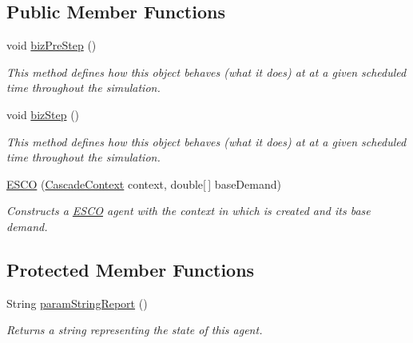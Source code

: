 \subsection*{Public Member Functions}
\begin{DoxyCompactItemize}
\item 
void \hyperlink{classuk_1_1ac_1_1dmu_1_1iesd_1_1cascade_1_1agents_1_1aggregators_1_1_e_s_c_o_a1bfb5cf021c3f6a5d0b517b97d358291}{biz\-Pre\-Step} ()
\begin{DoxyCompactList}\small\item\em This method defines how this object behaves (what it does) at at a given scheduled time throughout the simulation. \end{DoxyCompactList}\item 
\hypertarget{classuk_1_1ac_1_1dmu_1_1iesd_1_1cascade_1_1agents_1_1aggregators_1_1_e_s_c_o_a0b363a24a9396407b3e680b35fd31529}{void \hyperlink{classuk_1_1ac_1_1dmu_1_1iesd_1_1cascade_1_1agents_1_1aggregators_1_1_e_s_c_o_a0b363a24a9396407b3e680b35fd31529}{biz\-Step} ()}\label{classuk_1_1ac_1_1dmu_1_1iesd_1_1cascade_1_1agents_1_1aggregators_1_1_e_s_c_o_a0b363a24a9396407b3e680b35fd31529}

\begin{DoxyCompactList}\small\item\em This method defines how this object behaves (what it does) at at a given scheduled time throughout the simulation. \end{DoxyCompactList}\item 
\hyperlink{classuk_1_1ac_1_1dmu_1_1iesd_1_1cascade_1_1agents_1_1aggregators_1_1_e_s_c_o_aa00a5d88cc9d8ae17f2ec5485b42c083}{E\-S\-C\-O} (\hyperlink{classuk_1_1ac_1_1dmu_1_1iesd_1_1cascade_1_1context_1_1_cascade_context}{Cascade\-Context} context, double\mbox{[}$\,$\mbox{]} base\-Demand)
\begin{DoxyCompactList}\small\item\em Constructs a \hyperlink{classuk_1_1ac_1_1dmu_1_1iesd_1_1cascade_1_1agents_1_1aggregators_1_1_e_s_c_o}{E\-S\-C\-O} agent with the context in which is created and its base demand. \end{DoxyCompactList}\end{DoxyCompactItemize}
\subsection*{Protected Member Functions}
\begin{DoxyCompactItemize}
\item 
String \hyperlink{classuk_1_1ac_1_1dmu_1_1iesd_1_1cascade_1_1agents_1_1aggregators_1_1_e_s_c_o_a3128b25b565b25b240fc1fb511f9d310}{param\-String\-Report} ()
\begin{DoxyCompactList}\small\item\em Returns a string representing the state of this agent. \end{DoxyCompactList}\end{DoxyCompactItemize}
